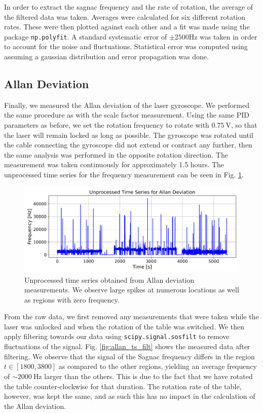 \documentclass[a4paper]{report}
\numberwithin{equation}{section}
\begin{document}
In order to extract the sagnac frequency and the rate of rotation, the average of the filtered data was taken. Averages were calculated for six different rotation rates. These were then plotted against each other and a fit was made using the package \texttt{np.polyfit}. A standard systematic error of $\pm 2500 \text{Hz}$ was taken in order to account for the noise and fluctuations. Statistical error was computed using assuming a gaussian distribution and error propagation was done. 


\subsection{Allan Deviation}

Finally, we measured the Allan deviation of the laser gyroscope. We performed the same procedure as with the scale factor measurement. 
Using the same PID parameters as before, we set the rotation frequency to rotate with $\SI{0.75}{\volt}$, so that the laser will 
remain locked as long as possible. The gyroscope was rotated until the cable connecting the gyroscope did not extend or contract
any further, then the same analysis was performed in the opposite rotation direction. The measurement was taken continuously for 
approximately 1.5 hours. The unprocessed time series for the frequency measurement can be seen in Fig. \ref{fig:allan_ts_raw}. \par 


\begin{figure}[h!]
	\centering
	\includegraphics[width=0.8\columnwidth]{allan_ts_raw.png}
	\caption{Unprocessed time series obtained from Allan deviation measurements. We observe large
			spikes at numerous locations as well as regions with zero frequency.}
	\label{fig:allan_ts_raw}
\end{figure}

From the raw data, we first removed any measurements that were taken while the laser was unlocked and when the 
rotation of the table was switched. We then apply filtering towards our data using \texttt{scipy.signal.sosfilt} to remove
fluctuations of the signal. Fig. \ref{fig:allan_ts_filt} shows the measured data after filtering. We observe that the signal of 
the Sagnac frequency differs in the region $t \in [1800, 3800]$ as compared to the other regions, yielding an average frequency
of $\sim \SI{2000}{\hertz}$ larger than the others. This is due to the fact that we have rotated the table counter-clockwise
for that duration. The rotation rate of the table, however, was kept the same, and as such this has no impact in the 
calculation of the Allan deviation. \par 
\end{document}
